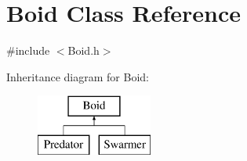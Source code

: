 \hypertarget{class_boid}{}\section{Boid Class Reference}
\label{class_boid}


{\ttfamily \#include $<$Boid.\+h$>$}

Inheritance diagram for Boid\+:\begin{figure}[H]
\begin{center}
\leavevmode
\includegraphics[height=2.000000cm]{class_boid}
\end{center}
\end{figure}
